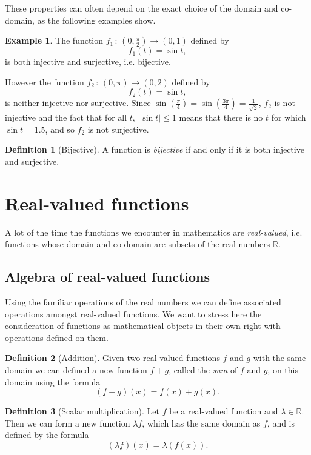 \documentclass[extrafontsizes, twoside, a4paper]{memoir}
\theoremstyle{plain}%
\theoremstyle{definition}
\newtheorem{defn}{Definition}[chapter]
\newtheorem{exmp}{Example}[chapter]
\theoremstyle{remark}
\begin{document}
These properties can often depend on the exact choice of the domain and co-domain, as the following examples show.
\begin{exmp}
The function $f_1 \, : \, \left ( 0,\frac{\pi}{2} \right ) \to (0,1)$ defined by
$$f_1(t) = \sin t ,$$
is both injective and surjective, i.e. bijective.

However the function $f_2 \, : \, (0,\pi) \to (0,2)$ defined by
$$f_2 (t) = \sin t ,$$
is neither injective nor surjective. Since $\sin \left ( \frac{\pi}{4} \right ) = \sin \left ( \frac{3 \pi}{4}  \right ) = \frac{1}{\sqrt{2}}$, $f_2$ is not injective and the fact that for all $t$, $|\sin t | \leq 1$ means that there is no $t$ for which $\sin t = 1.5 $, and so $f_2$ is not surjective.
\end{exmp}

\begin{defn}[Bijective]
A function is \emph{bijective} if and only if it is both injective and surjective.
\end{defn}

\section{Real-valued functions}
A lot of the time the functions we encounter in mathematics are \emph{real-valued}, i.e. functions whose domain and co-domain are subsets of the real numbers $\mathbb{R}$.

\subsection{Algebra of real-valued functions}
Using the familiar operations of the real numbers we can define associated operations amongst real-valued functions. We want to stress here the consideration of functions as mathematical objects in their own right with operations defined on them.

\begin{defn}[Addition]
Given two real-valued functions $f$ and $g$ with the same domain we can defined a new function $f+g$, called the \emph{sum} of $f$ and $g$, on this domain using the formula
$$ \left ( f + g \right ) (x) = f(x) + g(x) .$$
\end{defn}

\begin{defn}[Scalar multiplication]
Let $f$ be a real-valued function and $\lambda \in \mathbb{R}$. Then we can form a new function $\lambda f$, which has the same domain as $f$, and is defined by the formula
$$ \left ( \lambda f \right ) (x) = \lambda \left ( f(x) \right ).$$
\end{defn}
\end{document}
